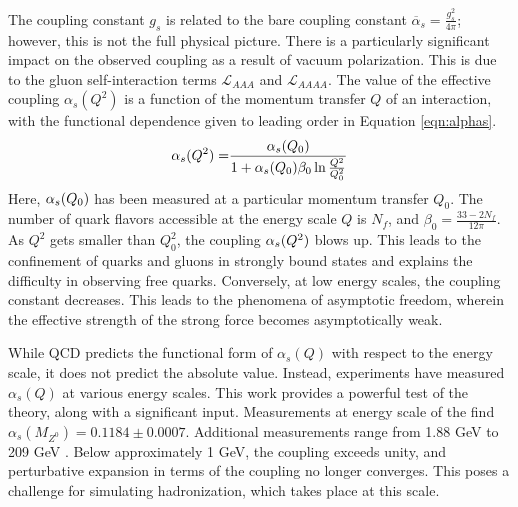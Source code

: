 The coupling constant $g_s$ is related to the bare coupling constant $\overline{\alpha}_s=\frac{g^2_s}{4\pi}$; however, this is not the full physical picture.
There is a particularly significant impact on the observed coupling as a result of vacuum polarization.
This is due to the gluon self-interaction terms $\mathcal{L}_{AAA}$ and $\mathcal{L}_{AAAA}$.
The value of the effective coupling $\alpha_s(Q^2)$ is a function of the momentum transfer $Q$ of an interaction, with the functional dependence given to leading order in Equation \ref{eqn:alphas}.
\begin{equation}\begin{split}\label{eqn:alphas}
    \alpha_s(Q^2)=&\frac{\alpha_s(Q_0)}{1+\alpha_s(Q_0)\beta_0\ln\frac{Q^2}{Q_0^2}} \\
\end{split}\end{equation}
Here, $\alpha_s(Q_0)$ has been measured at a particular momentum transfer $Q_0$.
The number of quark flavors accessible at the energy scale $Q$ is $N_f$, and $\beta_0=\frac{33-2N_f}{12\pi}$.
As $Q^2$ gets smaller than $Q_0^2$, the coupling $\alpha_s(Q^2)$ blows up.
This leads to the confinement of quarks and gluons in strongly bound states and explains the difficulty in observing free quarks.
Conversely, at low energy scales, the coupling constant decreases.
This leads to the phenomena of asymptotic freedom, wherein the effective strength of the strong force becomes asymptotically weak.

While QCD predicts the functional form of $\alpha_s(Q)$ with respect to the energy scale, it does not predict the absolute value.
Instead, experiments have measured $\alpha_s(Q)$ at various energy scales.
This work provides a powerful test of the theory, along with a significant input.
Measurements at energy scale of the \Z find $\alpha_s(M_{Z^0})=0.1184\pm0.0007$.
Additional measurements range from 1.88 GeV to 209 GeV \cite{bethke}.
Below approximately 1 GeV, the coupling exceeds unity, and perturbative expansion in terms of the coupling no longer converges.
This poses a challenge for simulating hadronization, which takes place at this scale.

